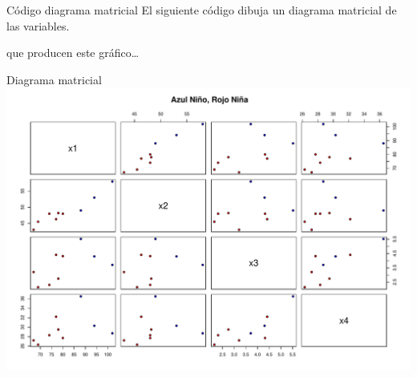 \documentclass[
  ignorenonframetext,
]{beamer}
\newenvironment{Shaded}{\begin{snugshade}}{\end{snugshade}}
\newcommand{\AttributeTok}[1]{\textcolor[rgb]{0.13,0.29,0.53}{#1}}
\newcommand{\DecValTok}[1]{\textcolor[rgb]{0.00,0.00,0.81}{#1}}
\newcommand{\FunctionTok}[1]{\textcolor[rgb]{0.13,0.29,0.53}{\textbf{#1}}}
\newcommand{\NormalTok}[1]{#1}
\newcommand{\SpecialCharTok}[1]{\textcolor[rgb]{0.81,0.36,0.00}{\textbf{#1}}}
\newcommand{\StringTok}[1]{\textcolor[rgb]{0.31,0.60,0.02}{#1}}
\begin{document}
\begin{frame}[fragile]{Código diagrama matricial}
\label{cuxf3digo-diagrama-matricial}
El siguiente código dibuja un diagrama matricial de las variables.

\begin{Shaded}
\end{Shaded}

que producen este gráfico\ldots{}
\end{frame}

\begin{frame}{Diagrama matricial}
\label{diagrama-matricial}
\includegraphics{AnalisisComponentesPrincipales_fusion_files/figure-beamer/unnamed-chunk-2-1.pdf}
\end{frame}
\end{document}
